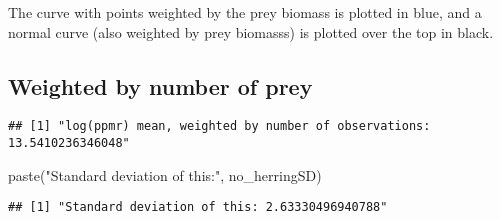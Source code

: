 \documentclass[
]{article}
\newenvironment{Shaded}{\begin{snugshade}}{\end{snugshade}}
\newcommand{\AttributeTok}[1]{\textcolor[rgb]{0.77,0.63,0.00}{#1}}
\newcommand{\CommentTok}[1]{\textcolor[rgb]{0.56,0.35,0.01}{\textit{#1}}}
\newcommand{\ConstantTok}[1]{\textcolor[rgb]{0.00,0.00,0.00}{#1}}
\newcommand{\FunctionTok}[1]{\textcolor[rgb]{0.00,0.00,0.00}{#1}}
\newcommand{\NormalTok}[1]{#1}
\newcommand{\OtherTok}[1]{\textcolor[rgb]{0.56,0.35,0.01}{#1}}
\newcommand{\SpecialCharTok}[1]{\textcolor[rgb]{0.00,0.00,0.00}{#1}}
\newcommand{\StringTok}[1]{\textcolor[rgb]{0.31,0.60,0.02}{#1}}
\begin{document}
The curve with points weighted by the prey biomass is plotted in blue,
and a normal curve (also weighted by prey biomasss) is plotted over the
top in black.

\hypertarget{weighted-by-number-of-prey-1}{%
\subsection{Weighted by number of
prey}\label{weighted-by-number-of-prey-1}}

\begin{Shaded}
\end{Shaded}

\begin{verbatim}
## [1] "log(ppmr) mean, weighted by number of observations: 13.5410236346048"
\end{verbatim}

\begin{Shaded}
\begin{Highlighting}[]
\FunctionTok{paste}\NormalTok{(}\StringTok{"Standard deviation of this:"}\NormalTok{, no\_herringSD)}
\end{Highlighting}
\end{Shaded}

\begin{verbatim}
## [1] "Standard deviation of this: 2.63330496940788"
\end{verbatim}
\end{document}
